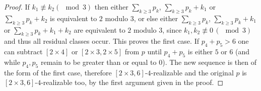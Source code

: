 \begin{theorem}
\begin{proof}
    If $k_1 \not\equiv k_2 (\mod 3)$ then either $\sum_{k\geq 3} p_k$, $\sum_{k\geq 3} p_k + k_1$ or $\sum_{k\geq 3} p_k + k_2$ is equivalent to $2$ modulo $3$, or else either $\sum_{k\geq 3} p_k$, $\sum_{k\geq 3} p_k + k_1$ or $\sum_{k\geq 3} p_k + k_1 + k_2$ are equivalent to $2$ modulo $3$, since $k_1, k_2 \not\equiv 0\,(\mod 3)$ and thus all residual classes occur. This proves the first case. If $p_4 + p_5 > 6$ one can subtract $[2 \times 4]$ or $[2 \times 3, 2 \times 5]$ from $p$ until $p_4 + p_5$ is either $5$ or $6$ (and while $p_4, p_5$ remain to be greater than or equal to $0$). The new sequence is then of the form of the first case, therefore $[2 \times 3, 6]$-$4$-realizable and the original $p$ is $[2 \times 3, 6]$-$4$-realizable too, by the first argument given in the proof.
  \end{proof}
\end{theorem}
